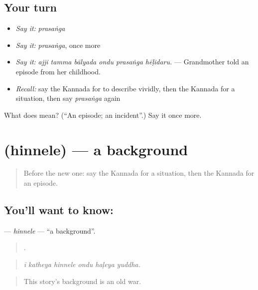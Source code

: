 \subsection*{Your turn}
\begin{itemize}
\raggedright
  \item \emph{Say it:} \emph{prasaṅga}
  \item \emph{Say it:} \emph{prasaṅga}, once more
  \item \emph{Say it:} \emph{ajji tamma bālyada ondu prasaṅga hēḷidaru.} — Grandmother told an episode from her childhood.
  \item \emph{Recall:} say the Kannada for to describe vividly, then the Kannada for a situation, then say \emph{prasaṅga} again
\end{itemize}

\begin{tcolorbox}[breakable,colback=teal!4,colframe=teal!35!black,title={Before you move on}]
What does  mean? (\textquotedblleft{}An episode; an incident\textquotedblright{}.) Say it once more.
\end{tcolorbox}
\section[\texorpdfstring{\kn{ಹಿನ್ನೆಲೆ} (hinnele)}{ಹಿನ್ನೆಲೆ (hinnele)}]{ (hinnele) — a background}

\label{lesson:KA-C343-hinnele}



\begin{quote}
Before the new one: say the Kannada for a situation, then the Kannada for an episode.
\end{quote}

\subsection*{You'll want to know: }
\textbf{} — \emph{hinnele} — \textquotedblleft{}a background\textquotedblright{}.

\begin{quote}
     .
\end{quote}

\begin{quote}
\emph{ī katheya hinnele ondu haḷeya yuddha.}
\end{quote}

\begin{quote}
This story's background is an old war.
\end{quote}

